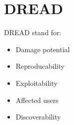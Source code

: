 \section{DREAD}

\begin{flushleft}
DREAD stand for:
\begin{itemize}
	\item Damage potential
	\item Reproducability
	\item Exploitability
	\item Affected users
	\item Discoverability
\end{itemize}
\end{flushleft}
